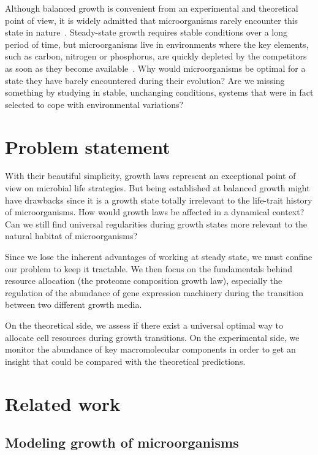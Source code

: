 Although balanced growth is convenient from an experimental and theoretical point of view, it is widely admitted that microorganisms rarely encounter this state in nature~\cite{schaechter_microbe_2006}.
Steady-state growth requires stable conditions over a long period of time, but microorganisms live in
environments where the key elements, such as carbon, nitrogen or phosphorus, are quickly depleted by the competitors as soon as they become available~\cite{mcarthur_microbial_2006,menge_nitrogen_2012,hobbie_microbes_2013}.
Why would microorganisms be optimal for a state they have barely encountered during their evolution?
Are we missing something by studying in stable, unchanging conditions, systems that were in fact selected to cope with environmental variations?

\section{Problem statement}

With their beautiful simplicity, growth laws represent an exceptional point of view on microbial life strategies.
But being established at balanced growth might have drawbacks since it is a growth state totally irrelevant to the life-trait history of microorganisms.
How would growth laws be affected in a dynamical context?
Can we still find universal regularities during growth states more relevant to the natural habitat of microorganisms?

Since we lose the inherent advantages of working at steady state, we must confine our problem to keep it tractable.
We then focus on the fundamentals behind resource allocation (the proteome composition growth law), especially the regulation of the abundance of gene expression machinery during the transition between two different growth media.

On the theoretical side, we assess if there exist a universal optimal way to allocate cell resources during growth transitions.
On the experimental side, we monitor the abundance of key macromolecular components in order to get an insight that could be compared with the theoretical predictions.

\section{Related work}

\subsection{Modeling growth of microorganisms}

